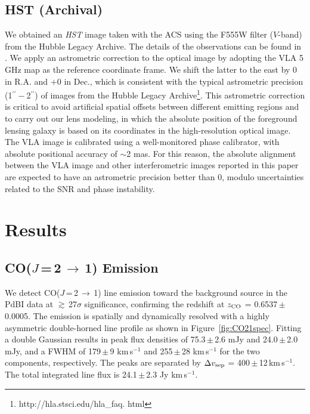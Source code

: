 \documentclass[]{emulateapj}
\newcommand{\rarr}{$\rightarrow$}
\newcommand{\bco}{\mbox{CO($J$\,=\,2\,\rarr\,1)}\xspace}
\newcommand{\kms}{\mbox{km\,s$^{-1}$}\xspace}
\newcommand{\pmm}{\,$\pm$\,}
\newcommand{\Fig}[1]{Figure~\ref{fig:#1}}
\begin{document}
\subsection{HST (Archival)}
We obtained an {\it HST} image taken with
the ACS
using the F555W filter ($V$-band)
from the
Hubble Legacy Archive.
The details of the observations can be found
in .
We apply an astrometric correction to the optical image by adopting the VLA 5\,GHz map as the
reference coordinate frame.
We shift the latter to the east by 0 in R.A. and $+$0 in
Dec., which is consistent with the typical astrometric precision (1$^{\prime\prime}-$2$^{\prime\prime}$) of
images from the Hubble Legacy Archive\footnote{http://hla.stsci.edu/hla\_faq.
html}. This astrometric correction is critical to avoid artificial spatial
offsets between different emitting regions and to carry out our lens modeling,
in which the absolute position of the foreground lensing galaxy is based on
its coordinates in the high-resolution optical image.
The VLA image is calibrated using a well-monitored phase
calibrator, with absolute positional accuracy of $\sim$2 mas.
For this reason, the absolute alignment between the VLA image and other
interferometric images reported in this paper are expected to have an astrometric
precision better than 0, modulo uncertainties related to the SNR and phase
instability.

\section{Results} \label{sec:results}
\subsection{\bco Emission} \label{sec:CO21}
We detect \bco line emission toward the background source in the PdBI data
at $\gtrsim$\,27$\sigma$ significance, confirming the redshift at $z_{\rm CO}$ =
0.6537\,$\pm$\,0.0005. The emission is spatially and dynamically resolved
with a highly asymmetric double-horned line profile
as shown in \Fig{CO21spec}. Fitting a double Gaussian results in peak
flux densities of 75.3\pmm2.6 mJy and 24.0\pmm2.0 mJy, and a FWHM of
179\pmm9 \kms and 255\pmm28 \kms for the two components, respectively. The peaks are separated by
$\Delta v_{\rm sep}$ = 400\pmm12\,\kms. The total integrated line flux is 24.1\,$\pm$\,2.3 Jy \kms.
\end{document}
